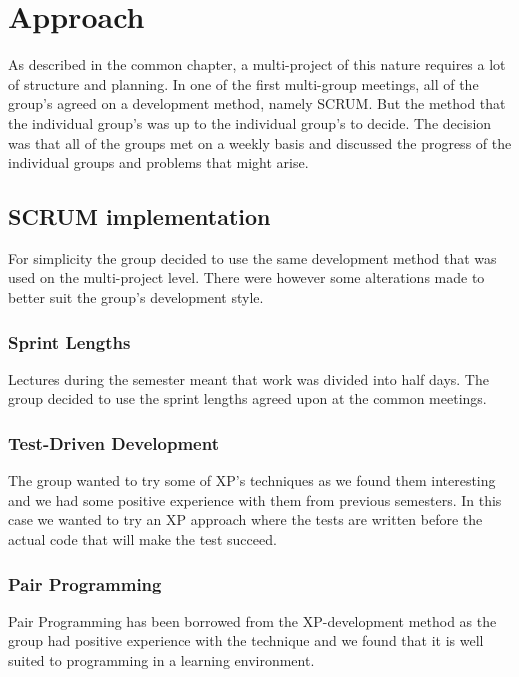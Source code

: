 \section{Approach}
As described in the common chapter, a multi-project of this nature requires a lot of structure and planning. In one of the first multi-group meetings, all of the group's agreed on a development method, namely SCRUM.  But the method that the individual group's was up to the individual group's to decide. The decision was that all of the groups met on a weekly basis and discussed the progress of the individual groups and problems that might arise.  

\subsection{SCRUM implementation} %
\label{sub:scrum_implementation}
For simplicity the group decided to use the same development method that was used on the multi-project level. There were however some alterations made to better suit the group's development style.

\subsubsection{Sprint Lengths}
Lectures during the semester meant that work was divided into half days. The group decided to use the sprint lengths agreed upon at the common meetings. 

\subsubsection{Test-Driven Development}
The group wanted to try some of XP's techniques as we found them interesting and we had some positive experience with them from previous semesters. In this case we wanted to try an XP approach where the tests are written before the actual code that will make the test succeed.

\subsubsection{Pair Programming}
Pair Programming has been borrowed from the XP-development method as the group had positive experience with the technique and we found that it is well suited to programming in a learning environment. 

